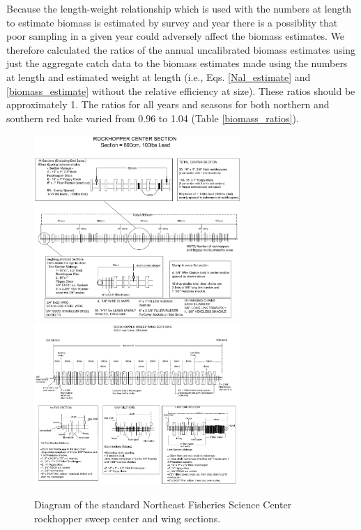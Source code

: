 \documentclass[12pt,letterpaper, leqno]{article}
\begin{document}
Because the length-weight relationship which is used with the numbers at length to estimate biomass is estimated by survey and year there is a possiblity that poor sampling in a given year could adversely affect the biomass estimates.  We therefore calculated the ratios of the annual uncalibrated biomass estimates using just the aggregate catch data to the biomass estimates made using the numbers at length and estimated weight at length (i.e., Eqs. \ref{Nal_estimate} and \ref{biomass_estimate} without the relative efficiency at size). These ratios should be approximately 1. The ratios for all years and seasons for both northern and southern red hake varied from 0.96 to 1.04 (Table \ref{biomass_ratios}).





\clearpage

\begin{figure}
\caption{Diagram of the standard Northeast Fisheries Science Center rockhopper sweep center and wing sections.}\label{rockhopper_schematic}
\begin{center}
\includegraphics[width = 0.7\textwidth]{rockhopper_schematic_1.pdf}
\includegraphics[width = 0.7\textwidth]{rockhopper_schematic_2.pdf}
\end{center}
\end{figure}
\clearpage
\end{document}
